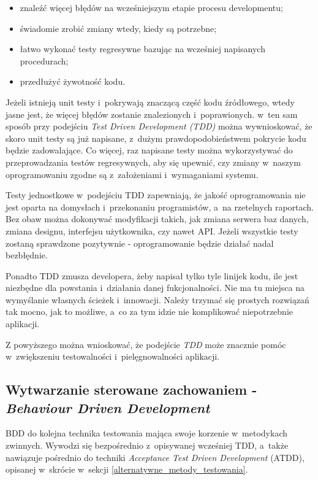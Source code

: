 \begin{itemize}
\item znaleźć więcej błędów na wcześniejszym etapie procesu developmentu;
\item świadomie zrobić zmiany wtedy, kiedy są potrzebne;
\item łatwo wykonać testy regresywne bazując na wcześniej napisanych procedurach;
\item przedłużyć żywotność kodu.
\end{itemize}

Jeżeli istnieją unit testy i~pokrywają znaczącą część kodu źródłowego, wtedy jasne jest, że więcej błędów zostanie znalezionych i~poprawionych. w~ten sam sposób przy podejściu \textit{Test Driven Development (TDD)} można wywnioskować, że skoro unit testy są już napisane, z~dużym prawdopodobieństwem pokrycie kodu będzie zadowalające. Co więcej, raz napisane testy można wykorzystywać do przeprowadzania testów regresywnych, aby się upewnić, czy zmiany w~naszym oprogramowaniu zgodne są z~założeniami i~wymaganiami systemu.

Testy jednostkowe w~podejściu TDD zapewniają, że jakość oprogramowania nie jest oparta na domysłach i~przekonaniu programistów, a~na rzetelnych raportach. Bez obaw można dokonywać modyfikacji takich, jak zmiana serwera baz danych, zmiana designu, interfejsu użytkownika, czy nawet API. Jeżeli wszystkie testy zostaną sprawdzone pozytywnie - oprogramowanie będzie działać nadal bezbłędnie.

Ponadto TDD zmusza developera, żeby napisał tylko tyle linijek kodu, ile jest niezbędne dla powstania i~działania danej fukcjonalności. Nie ma tu miejsca na wymyślanie własnych ścieżek i~innowacji. Należy trzymać się prostych rozwiązań tak mocno, jak to możliwe, a~co za tym idzie nie komplikować niepotrzebnie aplikacji.

Z powyższego można wnioskować, że podejście \textit{TDD} może znacznie pomóc w~zwiększeniu testowalności i~pielęgnowalności aplikacji. 

\subsection{Wytwarzanie sterowane zachowaniem - \textit{Behaviour Driven Development}}
\label{behaviour_driven_development}
BDD do kolejna technika testowania mająca swoje korzenie w~metodykach zwinnych. Wywodzi się bezpośrednio z~opisywanej wcześniej TDD, a~także  nawiązuje pośrednio do techniki \textit{Acceptance Test Driven Development} (ATDD), opisanej w~skrócie w~sekcji \ref{alternatywne_metody_testowania}.

